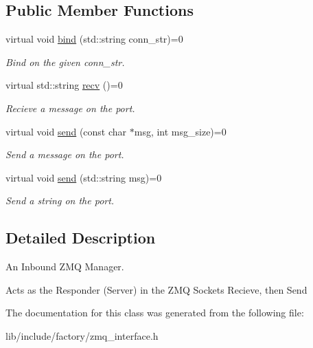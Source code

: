 \subsection*{Public Member Functions}
\begin{DoxyCompactItemize}
\item 
\hypertarget{classZmqIn_ad6037a187635f7d46bab5da961156751}{virtual void \hyperlink{classZmqIn_ad6037a187635f7d46bab5da961156751}{bind} (std\-::string conn\-\_\-str)=0}\label{classZmqIn_ad6037a187635f7d46bab5da961156751}

\begin{DoxyCompactList}\small\item\em Bind on the given conn\-\_\-str. \end{DoxyCompactList}\item 
\hypertarget{classZmqIn_a375de593defd4c2cf3adebad063950fe}{virtual std\-::string \hyperlink{classZmqIn_a375de593defd4c2cf3adebad063950fe}{recv} ()=0}\label{classZmqIn_a375de593defd4c2cf3adebad063950fe}

\begin{DoxyCompactList}\small\item\em Recieve a message on the port. \end{DoxyCompactList}\item 
\hypertarget{classZmqIn_ad2a35cc76a5b0b2412fda5418f708e60}{virtual void \hyperlink{classZmqIn_ad2a35cc76a5b0b2412fda5418f708e60}{send} (const char $\ast$msg, int msg\-\_\-size)=0}\label{classZmqIn_ad2a35cc76a5b0b2412fda5418f708e60}

\begin{DoxyCompactList}\small\item\em Send a message on the port. \end{DoxyCompactList}\item 
\hypertarget{classZmqIn_adf4165c263ddc5b68099b93b9f37f592}{virtual void \hyperlink{classZmqIn_adf4165c263ddc5b68099b93b9f37f592}{send} (std\-::string msg)=0}\label{classZmqIn_adf4165c263ddc5b68099b93b9f37f592}

\begin{DoxyCompactList}\small\item\em Send a string on the port. \end{DoxyCompactList}\end{DoxyCompactItemize}


\subsection{Detailed Description}
An Inbound Z\-M\-Q Manager. 

Acts as the Responder (Server) in the Z\-M\-Q Sockets Recieve, then Send 

The documentation for this class was generated from the following file\-:\begin{DoxyCompactItemize}
\item 
lib/include/factory/zmq\-\_\-interface.\-h\end{DoxyCompactItemize}
